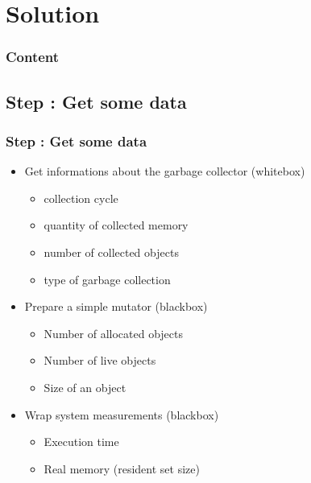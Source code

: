 %
%
\section{Solution}

\begin{frame}
	\frametitle{Content}
	\setcounter{tocdepth}{2}
	\tableofcontents[currentsection]
\end{frame}


\subsection{Step \theStepCounter: Get some data}
\begin{frame}
	\frametitle{Step \theStepCounter: Get some data}
	\begin{itemize}
		\item Get informations about the garbage collector (whitebox)
		\begin{itemize}
			\item collection cycle
			\item quantity of collected memory
			\item number of collected objects
			\item type of garbage collection
		\end{itemize}
			
		\pause
			
		\item Prepare a simple mutator (blackbox)
		\begin{itemize}
			\item Number of allocated objects
			\item Number of live objects
			\item Size of an object
		\end{itemize}
			
		\pause
			
		\item Wrap system measurements (blackbox)
		\begin{itemize}
			\item Execution time
			\item Real memory (resident set size) 
		\end{itemize}
	\end{itemize}
\end{frame}
	
